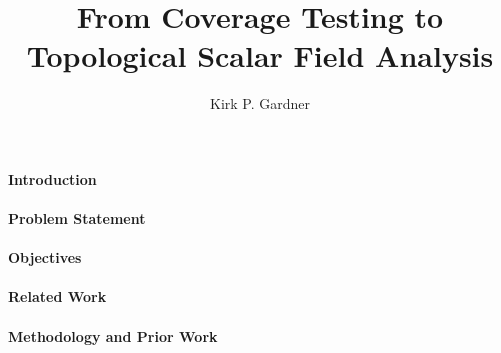 \documentclass[12pt]{article}
\title{From Coverage Testing to Topological Scalar Field Analysis}
\author{Kirk P. Gardner}
\begin{document}
\maketitle
\paragraph{Introduction}


\paragraph{Problem Statement}


\paragraph{Objectives}


\paragraph{Related Work}


\clearpage
\paragraph{Methodology and Prior Work}





\end{document}

